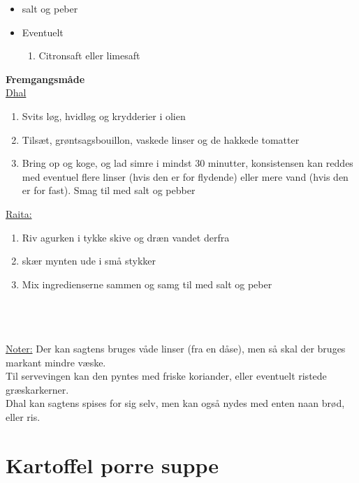 \documentclass{book}
\begin{document}
{\begin{minipage}[t]{0.5\textwidth}
\begin{itemize}
    \item salt og peber
    \item Eventuelt
    \begin{enumerate}
        \item Citronsaft eller limesaft
    \end{enumerate}
\end{itemize}
\end{minipage}
\begin{minipage}[t]{0.5\textwidth}
\textbf{Fremgangsmåde} \\
\underline{Dhal} 
\begin{enumerate}
    \item Svits løg, hvidløg og krydderier i olien
    \item Tilsæt, grøntsagsbouillon, vaskede linser og de hakkede tomatter
    \item Bring op og koge, og lad simre i mindst 30 minutter, konsistensen kan reddes med eventuel flere linser (hvis den er for flydende) eller mere vand (hvis den er for fast). Smag til med salt og pebber
\end{enumerate}
\underline{Raita:}
\begin{enumerate}
    \item Riv agurken i tykke skive og dræn vandet derfra
    \item skær mynten ude i små stykker
    \item Mix ingredienserne sammen og samg til med salt og peber
\end{enumerate}
\end{minipage}
\\ \\ \\ \underline{Noter:}
Der kan sagtens bruges våde linser (fra en dåse), men så skal der bruges markant mindre væske. \\ Til servevingen kan den pyntes med friske koriander, eller eventuelt ristede græskarkerner.  \\ Dhal kan sagtens spises for sig selv, men kan også nydes med enten naan brød, eller ris.
\newpage \section{Kartoffel porre suppe}
\begin{minipage}[t]{0.5\textwidth}
\end{minipage}
\begin{minipage}[t]{0.5\textwidth}
\end{minipage}
}
\end{document}
